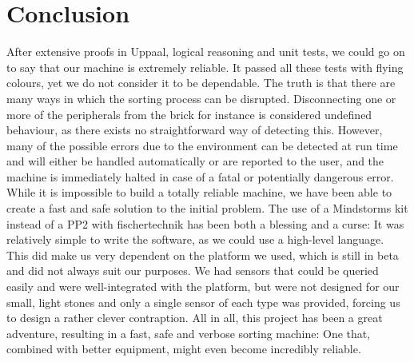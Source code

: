 \documentclass[a4paper,oneside,11pt]{report}
\begin{document}
\chapter{Conclusion}
After extensive proofs in Uppaal, logical reasoning and unit tests, we could go on to say that our machine is extremely reliable. It passed all these tests with flying colours, yet we do not consider it to be dependable. The truth is that there are many ways in which the sorting process can be disrupted. Disconnecting one or more of the peripherals from the brick for instance is considered undefined behaviour, as there exists no straightforward way of detecting this. However, many of the possible errors due to the environment can be detected at run time and will either be handled automatically or are reported to the user, and the machine is immediately halted in case of a fatal or potentially dangerous error.
While it is impossible to build a totally reliable machine, we have been able to create a fast and safe solution to the initial problem. The use of a Mindstorms kit instead of a PP2 with fischertechnik has been both a blessing and a curse: It was relatively simple to write the software, as we could use a high-level language. This did make us very dependent on the platform we used, which is still in beta and did not always suit our purposes. We had sensors that could be queried easily and were well-integrated with the platform, but were not designed for our small, light stones and only a single sensor of each type was provided, forcing us to design a rather clever contraption.
All in all, this project has been a great adventure, resulting in a fast, safe and verbose sorting machine: One that, combined with better equipment, might even become incredibly reliable.
\end{document}
